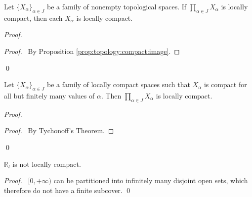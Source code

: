  \begin{prop}
 Let $\{X_\alpha\}_{\alpha \in J}$ be a family of nonempty topological
spaces. If    $\prod_{\alpha \in J} X_\alpha$ is locally compact, then each
$X_\alpha$ is locally compact.
\end{prop}

\begin{proof}
\pf
{}
\begin{proof}
  \pf\ By Proposition \ref{prop:topology:compact:image}.
\end{proof}
\qed
\end{proof}

\begin{prop}
 Let $\{ X_\alpha \}_{\alpha \in J}$ be a family of locally compact spaces
such that $X_\alpha$ is compact for all but finitely many values of $\alpha$.
Then $\prod_{\alpha \in J} X_\alpha$ is locally compact.
\end{prop}

\begin{proof}
\pf
{}
\begin{proof}
  \pf\ By Tychonoff's Theorem.
\end{proof}
\qed
\end{proof}

\begin{prop}
 $\mathbb{R}_l$ is not locally compact.
\end{prop}

\begin{proof}
\pf\ $[0, +\infty)$ can be partitioned into infinitely many disjoint open
sets, which therefore do not have a finite subcover. \qed
\end{proof}

